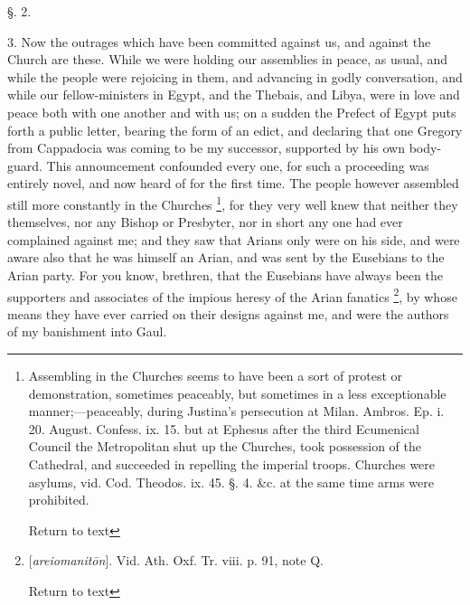 §. 2.

3. Now the outrages which have been committed
against us, and against the Church are these. While we were holding
our assemblies in peace, as usual, and while the people were rejoicing
in them, and advancing in godly conversation, and while our
fellow-ministers in Egypt, and the Thebais, and Libya, were in love
and peace both with one another and with us; on a sudden the Prefect
of Egypt puts forth a public letter, bearing the form of an edict, and
declaring that one Gregory from Cappadocia was coming to be my
successor, supported by his own body-guard. This announcement
confounded every one, for such a proceeding was entirely novel, and
now heard of for the first time. The people however assembled still
more constantly in the Churches \footnote{Assembling in the Churches seems to have been a sort of protest or
demonstration, sometimes peaceably, but sometimes in a less
exceptionable manner;—peaceably, during Justina's persecution at
Milan. Ambros. Ep. i. 20. August. Confess. ix. 15. but at Ephesus
after the third Ecumenical Council the Metropolitan shut up the
Churches, took possession of the Cathedral, and succeeded in repelling
the imperial troops. Churches were asylums, vid. Cod. Theodos. ix. 45.
§. 4. \&c. at the same time arms were prohibited.

Return to text}, for they very well knew that neither they themselves, nor any
Bishop or Presbyter, nor in short any one had ever complained against
me; and they saw that Arians only were on his side, and were aware
also that he was himself an Arian, and was sent by the Eusebians to
the Arian party. For you know, brethren, that the Eusebians have
always been the supporters and associates of the impious heresy of the
Arian fanatics \footnote{[\emph{areiomanit\={o}n}]. Vid. Ath. Oxf. Tr. viii. p. 91, note Q.

Return to text}, by
whose means they have ever carried on their designs against me, and
were the authors of my banishment into Gaul.

